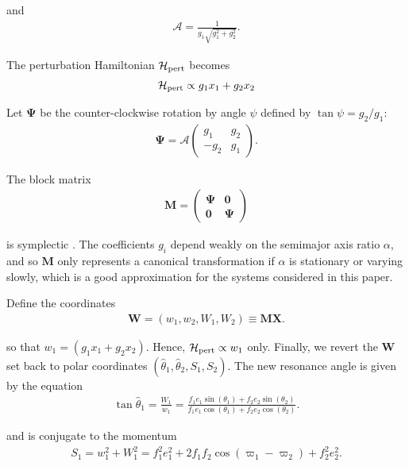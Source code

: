 \documentclass[usenatbib]{mnras}
\renewcommand{\v}[1]{\boldsymbol{ #1 }}
\begin{document}
\noindent and
\begin{align}
  \mathcal{A} = \frac{1}{g_1\sqrt{g_1^2+g_2^2}}.
\end{align}

\noindent The perturbation Hamiltonian \(\mathcal H_{\rm
pert}\) becomes
\begin{align}
  \mathcal H_{\rm pert} \propto g_1 x_1 + g_2 x_2
\end{align}

\noindent
Let \(\v \Psi\) be the
counter-clockwise rotation by angle \(\psi\) defined by \(\tan\psi=
g_2/g_1\):
\begin{align}
  \v \Psi =  \mathcal{A}
  \begin{pmatrix}
    g_1 & g_2 \\
    -g_2 & g_1 
  \end{pmatrix}.
\end{align}

\noindent The block matrix
\begin{align}
  \v M =
  \begin{pmatrix}
    \v \Psi & \v 0 \\
    \v 0 & \v \Psi
  \end{pmatrix}
\end{align}

\noindent is symplectic \citep{goldstein_classical_2000}.
The coefficients \(g_i\) depend weakly on the semimajor axis ratio
\(\alpha\), and so \(\v M\) only represents a canonical transformation if
\(\alpha\) is stationary or varying slowly, which is a good
approximation for the systems considered in this paper.

Define the coordinates
\begin{align}
   \v W = (w_1, w_2, W_1, W_2) \equiv \v M \v X.
\end{align}

\noindent so that \(w_1 = (g_1 x_1 + g_2 x_2)\).  Hence,
\(\mathcal H_{\rm pert}\propto w_1\) only.  Finally, we revert the \(\v
W\) set back to polar coordinates
\((\hat\theta_1,\hat\theta_2,S_1,S_2)\). The new resonance angle is
given by the equation
\begin{align}
\label{hattheta}
  \tan\hat{\theta}_1 = \frac{W_1}{w_1} = \frac{f_1 e_1\sin(\theta_1)
  + f_2e_2\sin(\theta_2)}{f_1e_1\cos(\theta_1) + f_2e_2\cos(\theta_2)}.
\end{align}

\noindent
and is conjugate to the momentum
\begin{align}
  S_1 = w_1^2 + W_1^2 = f_1^2e_1^2
  + 2f_1f_2\cos(\varpi_1 - \varpi_2) + f_2^2e_2^2.
\end{align}
\end{document}
